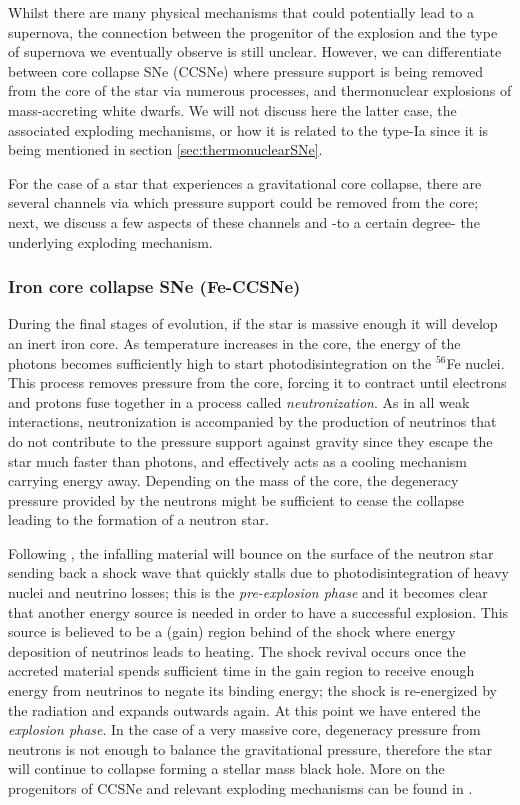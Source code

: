 \documentclass[../../main/thesis_msc.tex]{subfiles}
\begin{document}
				Whilst there are many physical mechanisms that could potentially lead to a supernova, the connection between the progenitor of the explosion and the type of supernova we eventually observe is still unclear. However, we can differentiate between core collapse SNe (CCSNe) where pressure support is being removed from the core of the star via numerous processes, and thermonuclear explosions of mass-accreting white dwarfs. We will not discuss here the latter case, the associated exploding mechanisms, or how it is related to the type-Ia since it is being mentioned in section \ref{sec:thermonuclearSNe}.
				
				For the case of a star that experiences a gravitational core collapse, there are several channels via which pressure support could be removed from the core; next, we discuss a few aspects of these channels and -to a certain degree- the underlying exploding mechanism.
				
				\subsubsection{Iron core collapse SNe (Fe-CCSNe)}
					
					During the final stages of evolution, if the star is massive enough it will develop an inert iron core. As temperature increases in the core, the energy of the photons becomes sufficiently high to start photodisintegration on the $^{56}$Fe nuclei. This process removes pressure from the core, forcing it to contract until electrons and protons fuse together in a process called \emph{neutronization}. As in all weak interactions, neutronization is accompanied by the production of neutrinos that do not contribute to the pressure support against gravity since they escape the star much faster than photons, and effectively acts as a cooling mechanism carrying energy away. Depending on the mass of the core, the degeneracy pressure provided by the neutrons might be sufficient to cease the collapse leading to the formation of a neutron star. 
					
					Following \cite{Muller2016}, the infalling material will bounce on the surface of the neutron star sending back a shock wave that quickly stalls due to photodisintegration of heavy nuclei and neutrino losses; this is the \emph{pre-explosion phase} and it becomes clear that another energy source is needed in order to have a successful explosion. This source is believed to be a (gain) region behind of the shock where energy deposition of neutrinos leads to heating. The shock revival occurs once the accreted material spends sufficient time in the gain region to receive enough energy from neutrinos to negate its binding energy; the shock is re-energized by the radiation and expands outwards again. At this point we have entered the \emph{explosion phase}. In the case of a very massive core, degeneracy pressure from neutrons is not enough to balance the gravitational pressure, therefore the star will continue to collapse forming a stellar mass black hole. More on the progenitors of CCSNe and relevant exploding mechanisms can be found in \cite{Smartt2009, Couch2017}.
\end{document}
